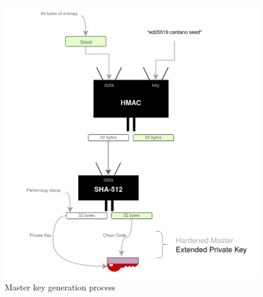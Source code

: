 \begin{figure}[ht!]
    \centering
    \includegraphics[width=1\textwidth]{images/slip23_master.png}
    \caption[Master key generation process]{Master key generation process}
    \label{fig:slip23_master}
\end{figure}

